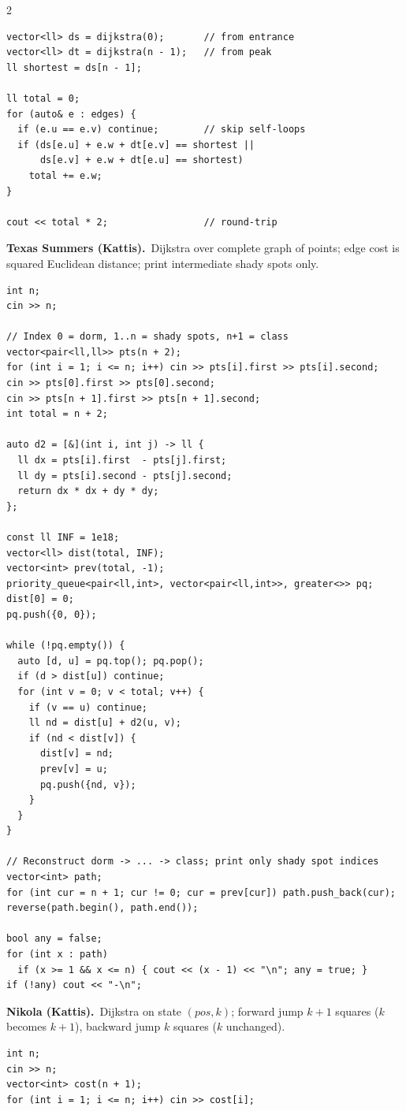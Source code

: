 \documentclass[10pt,letterpaper]{extarticle}
\newcommand{\prob}[2]{\par\addvspace{10pt}\noindent\label{prob:#1}\textbf{\normalsize #1.}\ {\small #2}\par\nopagebreak}
\begin{document}
\begin{multicols*}{2}
\begin{lstlisting}[style=cppt]
vector<ll> ds = dijkstra(0);       // from entrance
vector<ll> dt = dijkstra(n - 1);   // from peak
ll shortest = ds[n - 1];

ll total = 0;
for (auto& e : edges) {
  if (e.u == e.v) continue;        // skip self-loops
  if (ds[e.u] + e.w + dt[e.v] == shortest ||
      ds[e.v] + e.w + dt[e.u] == shortest)
    total += e.w;
}

cout << total * 2;                 // round-trip
\end{lstlisting}

\prob{Texas Summers (Kattis)}{Dijkstra over complete graph of points; edge cost is squared Euclidean distance; print intermediate shady spots only.}
\begin{lstlisting}[style=cppt]
int n;
cin >> n;

// Index 0 = dorm, 1..n = shady spots, n+1 = class
vector<pair<ll,ll>> pts(n + 2);
for (int i = 1; i <= n; i++) cin >> pts[i].first >> pts[i].second;
cin >> pts[0].first >> pts[0].second;
cin >> pts[n + 1].first >> pts[n + 1].second;
int total = n + 2;

auto d2 = [&](int i, int j) -> ll {
  ll dx = pts[i].first  - pts[j].first;
  ll dy = pts[i].second - pts[j].second;
  return dx * dx + dy * dy;
};

const ll INF = 1e18;
vector<ll> dist(total, INF);
vector<int> prev(total, -1);
priority_queue<pair<ll,int>, vector<pair<ll,int>>, greater<>> pq;
dist[0] = 0;
pq.push({0, 0});

while (!pq.empty()) {
  auto [d, u] = pq.top(); pq.pop();
  if (d > dist[u]) continue;
  for (int v = 0; v < total; v++) {
    if (v == u) continue;
    ll nd = dist[u] + d2(u, v);
    if (nd < dist[v]) {
      dist[v] = nd;
      prev[v] = u;
      pq.push({nd, v});
    }
  }
}

// Reconstruct dorm -> ... -> class; print only shady spot indices
vector<int> path;
for (int cur = n + 1; cur != 0; cur = prev[cur]) path.push_back(cur);
reverse(path.begin(), path.end());

bool any = false;
for (int x : path)
  if (x >= 1 && x <= n) { cout << (x - 1) << "\n"; any = true; }
if (!any) cout << "-\n";
\end{lstlisting}

\prob{Nikola (Kattis)}{Dijkstra on state $(pos, k)$; forward jump $k{+}1$ squares ($k$ becomes $k{+}1$), backward jump $k$ squares ($k$ unchanged).}
\begin{lstlisting}[style=cppt]
int n;
cin >> n;
vector<int> cost(n + 1);
for (int i = 1; i <= n; i++) cin >> cost[i];


\end{lstlisting}
\end{multicols*}
\end{document}

